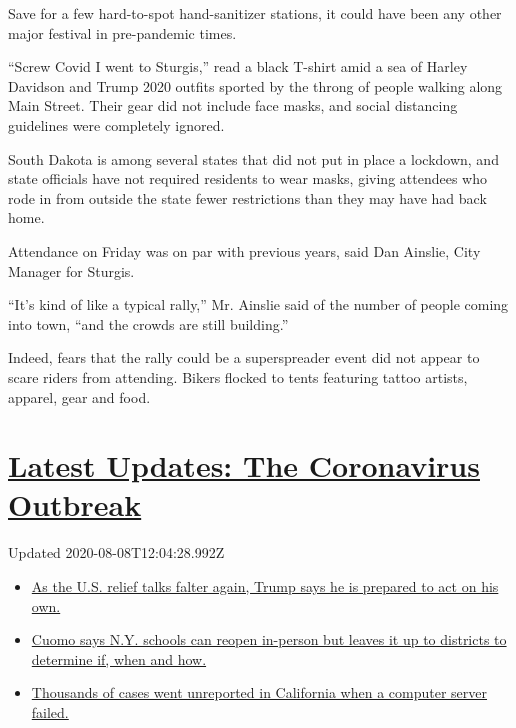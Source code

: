 Save for a few hard-to-spot hand-sanitizer stations, it could have been
any other major festival in pre-pandemic times.

``Screw Covid I went to Sturgis,'' read a black T-shirt amid a sea of
Harley Davidson and Trump 2020 outfits sported by the throng of people
walking along Main Street. Their gear did not include face masks, and
social distancing guidelines were completely ignored.

South Dakota is among several states that did not put in place a
lockdown, and state officials have not required residents to wear masks,
giving attendees who rode in from outside the state fewer restrictions
than they may have had back home.

Attendance on Friday was on par with previous years, said Dan Ainslie,
City Manager for Sturgis.

``It's kind of like a typical rally,'' Mr. Ainslie said of the number of
people coming into town, ``and the crowds are still building.''

Indeed, fears that the rally could be a superspreader event did not
appear to scare riders from attending. Bikers flocked to tents featuring
tattoo artists, apparel, gear and food.

\hypertarget{latest-updates-the-coronavirus-outbreak}{%
\section{\texorpdfstring{\href{https://www.nytimes.com/2020/08/07/world/covid-19-news.html?action=click\&pgtype=Article\&state=default\&region=MAIN_CONTENT_1\&context=storylines_live_updates}{Latest
Updates: The Coronavirus
Outbreak}}{Latest Updates: The Coronavirus Outbreak}}\label{latest-updates-the-coronavirus-outbreak}}

Updated 2020-08-08T12:04:28.992Z

\begin{itemize}
\tightlist
\item
  \href{https://www.nytimes.com/2020/08/07/world/covid-19-news.html?action=click\&pgtype=Article\&state=default\&region=MAIN_CONTENT_1\&context=storylines_live_updates\#link-1f86d03a}{As
  the U.S. relief talks falter again, Trump says he is prepared to act
  on his own.}
\item
  \href{https://www.nytimes.com/2020/08/07/world/covid-19-news.html?action=click\&pgtype=Article\&state=default\&region=MAIN_CONTENT_1\&context=storylines_live_updates\#link-3f64a70a}{Cuomo
  says N.Y. schools can reopen in-person but leaves it up to districts
  to determine if, when and how.}
\item
  \href{https://www.nytimes.com/2020/08/07/world/covid-19-news.html?action=click\&pgtype=Article\&state=default\&region=MAIN_CONTENT_1\&context=storylines_live_updates\#link-14e70066}{Thousands
  of cases went unreported in California when a computer server failed.}
\end{itemize}

